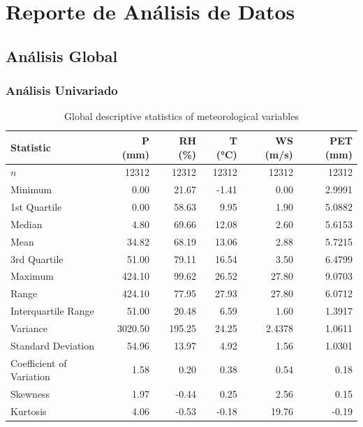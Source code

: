 \chapter{Reporte de Análisis de Datos}
\section{Análisis Global}

\subsection{Análisis Univariado}

\begin{table}[H]
\centering
\caption{Global descriptive statistics of meteorological variables}
\label{tab:global_statistics}
\small
\begin{tabular}{lrrrrr}
\toprule
\textbf{Statistic} & \textbf{P (mm)} & \textbf{RH (\%)} & \textbf{T (°C)} & \textbf{WS (m/s)} & \textbf{PET (mm)} \\
\midrule
$n$                         & 12312 & 12312 & 12312 & 12312 & 12312 \\
Minimum                    & 0.00   & 21.67  & -1.41  & 0.00   & 2.9991 \\
1st Quartile               & 0.00   & 58.63  & 9.95   & 1.90   & 5.0882 \\
Median                     & 4.80   & 69.66  & 12.08  & 2.60   & 5.6153 \\
Mean                       & 34.82  & 68.19  & 13.06  & 2.88   & 5.7215 \\
3rd Quartile               & 51.00  & 79.11  & 16.54  & 3.50   & 6.4799 \\
Maximum                    & 424.10 & 99.62  & 26.52  & 27.80  & 9.0703 \\
Range                      & 424.10 & 77.95  & 27.93  & 27.80  & 6.0712 \\
Interquartile Range        & 51.00  & 20.48  & 6.59   & 1.60   & 1.3917 \\
Variance                   & 3020.50 & 195.25 & 24.25  & 2.4378 & 1.0611 \\
Standard Deviation         & 54.96  & 13.97  & 4.92   & 1.56   & 1.0301 \\
Coefficient of Variation   & 1.58   & 0.20   & 0.38   & 0.54   & 0.18 \\
Skewness                 & 1.97   & -0.44  & 0.25   & 2.56   & 0.15 \\
Kurtosis                   & 4.06   & -0.53  & -0.18  & 19.76  & -0.19 \\
\bottomrule
\end{tabular}
\end{table}


